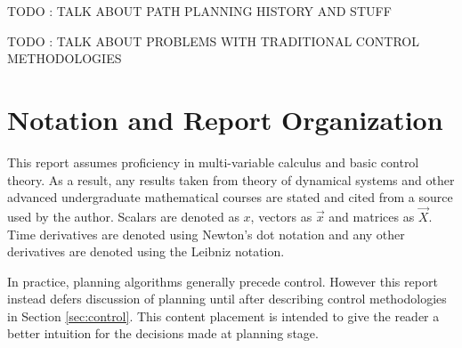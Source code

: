 \documentclass[oneside, 11pt]{book}
\begin{document}
TODO : TALK ABOUT PATH PLANNING HISTORY AND STUFF

TODO : TALK ABOUT PROBLEMS WITH TRADITIONAL CONTROL METHODOLOGIES

\section{Notation and Report Organization}
This report assumes proficiency in multi-variable calculus and basic control theory. As a result, any results taken from theory of dynamical systems and other advanced undergraduate mathematical courses are stated and cited from a source used by the author. Scalars are denoted as $x$, vectors as $\vec{x}$ and matrices as $\vec{X}$. Time derivatives are denoted using Newton's dot notation and any other derivatives are denoted using the Leibniz notation.

In practice, planning algorithms generally precede control. However this report instead defers discussion of planning until after describing control methodologies in Section \ref{sec:control}. This content placement is intended to give the reader a better intuition for the decisions made at planning stage.
\end{document}
